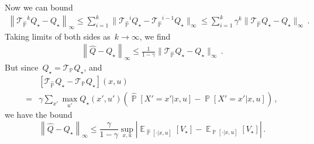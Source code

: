 \documentclass{tufte-book}
\begin{document}
Now we can bound \[
\begin{aligned}
    \left\| {\mathcal{T}_{\hat{\mathop\mathbb{P}}}}^{k}Q_\star - Q_\star\right\|_\infty \leq \sum_{i=1}^k \| {\mathcal{T}_{\hat{\mathop\mathbb{P}}}}^{i}Q_\star - {\mathcal{T}_{\hat{\mathop\mathbb{P}}}}^{i-1}Q_\star\|_\infty
    \leq     \sum_{i=1}^k \gamma^k \| {\mathcal{T}_{\hat{\mathop\mathbb{P}}}}^{}Q_\star -Q_\star\|_\infty\,.
\end{aligned}
\] Taking limits of both sides as~\(k\rightarrow\infty\), we find \[
\begin{aligned}
    \left\| \hat{Q} - Q_\star\right\|_\infty
    \leq    \frac{1}{1-\gamma}\| {\mathcal{T}_{\hat{\mathop\mathbb{P}}}}^{}Q_\star -Q_\star\|_\infty\,.
\end{aligned}
\] But since~\(Q_\star = {\mathcal{T}_{\mathop\mathbb{P}}}^{}Q_\star\),
and \[
\begin{aligned}
&    [{\mathcal{T}_{\hat{\mathop\mathbb{P}}}}^{}Q_\star -{\mathcal{T}_{\mathop\mathbb{P}}}^{}Q_\star](x,u)\\
     =&\gamma  \sum_{x'} \max_{u'} Q_\star(x',u') \left(\hat{\mathop\mathbb{P}}[X'=x'|x,u] -
      \mathop\mathbb{P}[X'=x'|x,u]
      \right) \,,
\end{aligned}
\] we have the bound \[
\left\| \hat{Q} - Q_\star\right\|_\infty \leq \frac{\gamma}{1-\gamma} \sup_{x,u} \left| \mathop\mathbb{E}_{\hat{\mathop\mathbb{P}}[\cdot|x,u]}[V_\star] - \mathop\mathbb{E}_{\mathop\mathbb{P} [\cdot|x,u]}[V_\star] \right|\,.
\]
\end{document}
